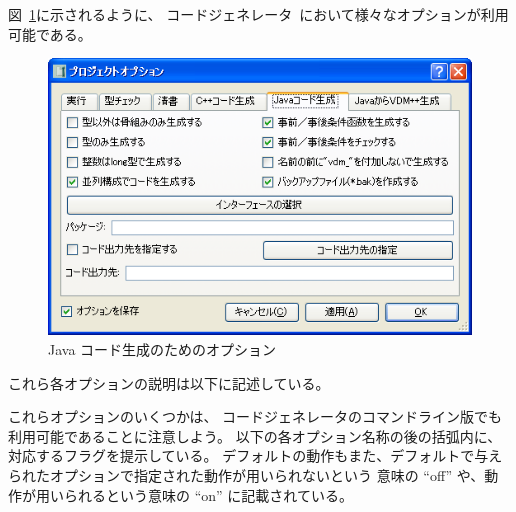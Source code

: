 \documentclass[\pformat,11pt]{jarticle}
\newcommand{\tcg}{コードジェネレータ}
\begin{document}
図~\ref{fig:options}に示されるように、 \tcg\ において様々なオプションが利用可能である。
\begin{figure}
\begin{center}
\includegraphics[width=.8\textwidth]{options}
\caption{Java コード生成のためのオプション}\label{fig:options}
\end{center}
\end{figure}
これら各オプションの説明は以下に記述している。

これらオプションのいくつかは、 \tcg のコマンドライン版でも利用可能であることに注意しよう。
以下の各オプション名称の後の括弧内に、対応するフラグを提示している。
デフォルトの動作もまた、デフォルトで与えられたオプションで指定された動作が用いられないという
意味の ``off'' や、動作が用いられるという意味の ``on'' に記載されている。
\end{document}

